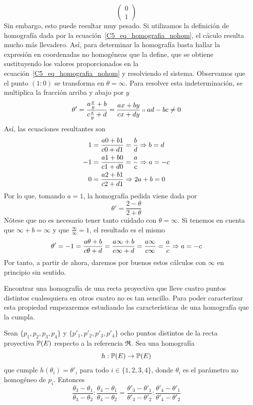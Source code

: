 \begin{exa}
\begin{equation*}
		\left( \begin{array}{c}
			0\\ 1
		\end{array}\right)
	\end{equation*}
	Sin embargo, esto puede resultar muy pesado. Si utilizamos la definición de homografía dada por la ecuación~\eqref{C5_eq_homografia_nohom}, el cáculo resulta mucho más llevadero. Así, para determinar la homografía basta hallar la expresión en coordenadas no homogéneas que la define, que se obtiene sustituyendo los valores proporcionados en la ecuación~\eqref{C5_eq_homografia_nohom} y resolviendo el sistema. Observamos que el punto $(1:0)$ se transforma en $\theta=\infty$. Para resolver esta indeterminación, se multiplica la fracción arriba y abajo por $y$
	\begin{equation}
		\theta'=\frac{a\frac{x}{y}+b}{c\frac{x}{y}+d}=\frac{ax+by}{cx +dy}\shortparallel ad-bc\not=0
	\end{equation}
	Así, las ecuaciones resultantes son
	\begin{equation*}
		\begin{split}
			1&=\frac{a0+b1}{c0 +d1}=\frac{b}{d}\Rightarrow b=d\\
			-1&=\frac{a1+b0}{c1 +d0}=\frac{a}{c}\Rightarrow a=-c\\
			0&=\frac{a2+b1}{c2 +d1}\Rightarrow 2a+b=0
		\end{split}
	\end{equation*}
	Por lo que, tomando $a=1$, la homografía pedida viene dada por
	\begin{equation*}
		\theta'=\frac{2-\theta}{2+\theta}
	\end{equation*}
	Nótese que no es necesario tener tanto cuidado con $\theta=\infty$. Si tenemos en cuenta que $\infty+b=\infty$ y que $\frac{\infty}{\infty}=1$, el resultado es el mismo
	\begin{equation*}
		\theta'=-1=\frac{a\theta+b}{c\theta +d}=\frac{a\infty+b}{c\infty +d}=\frac{a\infty}{c\infty}=\frac{a}{c}\Rightarrow a=-c
	\end{equation*}
	Por tanto, a partir de ahora, daremos por buenos estos cálculos con $\infty$ en principio sin sentido.
\end{exa}
Encontrar una homografía de una recta proyectiva que lleve cuatro puntos distintos cualesquiera en otros cuatro no es tan sencillo. Para poder caracterizar esta propiedad empezaremos estudiando las características de una homografía que la cumpla.
\begin{lem}
	Sean $\{p_1,p_2,p_3,p_4\}$ y $\{p'_1,p'_2,p'_3,p'_4\}$ ocho puntos distintos de la recta proyectiva $\mathbb{P}(E)$ respecto a la referencia $\mathfrak{R}$. Sea una homografía
	\[h:\mathbb{P}(E)\rightarrow \mathbb{P}(E)\]
	que cumple $h(\theta_i)=\theta'_i$ para todo $i\in\{1,2,3,4\}$, donde $\theta_i$ es el parámetro no homogéneo de $p_i$. Entonces
	\begin{equation}
		\frac{\theta_3-\theta_1}{\theta_3-\theta_2}:\frac{\theta_4-\theta_1}{\theta_4-\theta_2}=\frac{\theta'_3-\theta'_1}{\theta'_3-\theta'_2}:\frac{\theta'_4-\theta'_1}{\theta'_4-\theta'_2}
	\end{equation}
\end{lem}
